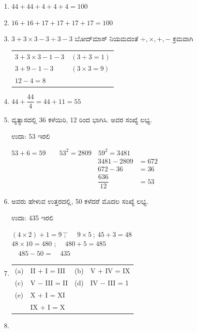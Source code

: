 \begin{enumerate}
\itemsep=5pt

\item $44+44+4+4+4 = 100$

\item $16+16+17+17+17+17 = 100$

\item $3+3\times 3 - 3 \div 3 - 3$ ಬೋದ್‌ಮಾಸ್ ನಿಯಮದಂತೆ $\div, \times, +, -$ ಕ್ರಮವಾಗಿ

\begin{tabular}[t]{ll}
$3+3\times 3 - 1 - 3$ & $(3 \div 3 = 1)$\\
$3+9 - 1 - 3$ & $(3 \times 3 = 9)$\\
$12 - 4 = 8$ & 
\end{tabular}

\item $44 + \dfrac{44}{4} = 44 + 11 = 55$

\item ವ್ಯತ್ಯಾಸದಲ್ಲಿ 36 ಕಳೆಯಿರಿ, 12 ರಿಂದ ಭಾಗಿಸಿ. ಅವರ ಸಂಖ್ಯೆ ಲಭ್ಯ. 

ಉದಾ: 53 ಇರಲಿ 

$53 + 6 =  59 \qquad 53^{2} = 2809 \quad 59^{2} = 3481$
\begin{align*}
3481 - 2809 & = 672\\
672 - 36 & = 36\\
\dfrac{636}{12} & = 53
\end{align*}

\item ಅವರು ಹೇಳುವ ಉತ್ತರದಲ್ಲಿ, 50 ಕಳೆದರೆ ಮೊದಲ ಸಂಖ್ಯೆ ಲಭ್ಯ. 

ಉದಾ: 435 ಇರಲಿ 
{\fontsize{11pt}{13pt}\selectfont
\begin{tabbing}
$(4\times 2) + 1 = 9$ \= ; \= $\quad 9\times 5 ~;~  45+3 = 48$\\
$48\times 10 = 480$ \> ; \> $\quad 480 + 5 = 485$\\
$\quad485 - 50$ \> = \> $\quad 435$
\end{tabbing}}\relax

\item
\begin{tabular}[t]{llll}
(a)& II $+$ I = III & (b)& V $+$ IV = IX\\
(c)& V $-$ III = II &(d)& IV $-$ III = 1\\
(e)& X $+$ I = XI & & \\
& IX $+$ I = X & &
\end{tabular}

\item 
~


\end{enumerate}
